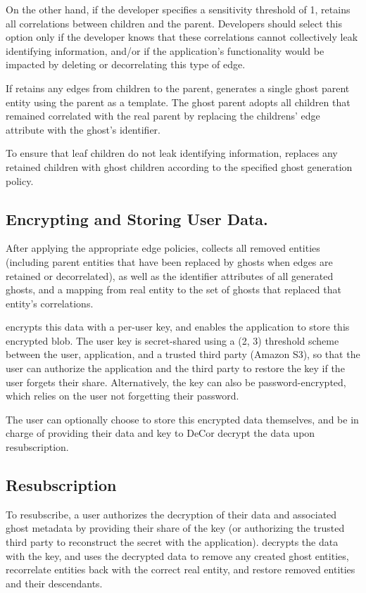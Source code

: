 On the other hand, if the developer specifies a sensitivity threshold of 1, \sys retains all
correlations between children and the parent. Developers should select this option only if the
developer knows that these correlations cannot collectively leak identifying information, and/or if
the application's functionality would be impacted by deleting or decorrelating this type of edge.

If \sys retains any edges from children to the parent, \sys generates a single ghost parent entity using the
parent as a template. The ghost parent adopts all children that remained correlated with the real
parent by replacing the childrens' edge attribute with the ghost's identifier.

To ensure that leaf children do not leak identifying information, 
\sys replaces any retained children with ghost children according to the specified ghost generation
policy.

\subsection{Encrypting and Storing User Data.}
\label{sec:design:storage}
After applying the appropriate edge policies, \sys collects all 
removed entities (including parent entities that
have been replaced by ghosts when edges are retained or decorrelated), as well as 
the identifier attributes of all generated ghosts, and a mapping from real
entity to the set of ghosts that replaced that entity's correlations. 

\sys encrypts this data with a per-user key, and enables the application to store this encrypted
blob. The user key is secret-shared using a (2, 3) threshold
scheme~\cite{secretsharing} between the user, application, and a trusted third party (\eg Amazon S3), so that the
user can authorize the application and the third party to restore the key if the user forgets their share. 
Alternatively, the key can also be password-encrypted, which relies on the user not forgetting their
password.

The user can optionally choose to store this encrypted data themselves, and be in charge of providing their
data and key to DeCor decrypt the data upon resubscription.

\subsection{Resubscription}
To resubscribe, a user authorizes the decryption of their data and associated ghost metadata by
providing their share of the key (or authorizing the trusted third party to reconstruct the secret
with the application). \sys decrypts the data with the key, and uses the decrypted data to remove
any created ghost entities, recorrelate entities back with the correct real entity, and restore
removed entities and their descendants. 
